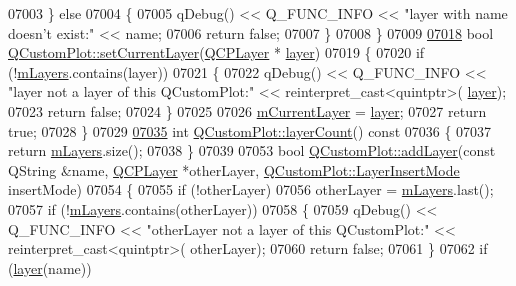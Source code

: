 \begin{DoxyCode}
07003   \} \textcolor{keywordflow}{else}
07004   \{
07005     qDebug() << Q\_FUNC\_INFO << \textcolor{stringliteral}{"layer with name doesn't exist:"} << name;
07006     \textcolor{keywordflow}{return} \textcolor{keyword}{false};
07007   \}
07008 \}
07009 
\hypertarget{a00115_source_l07018}{}\hyperlink{a00116_a23a4d3cadad1a0063c5fe19aac5659e6}{07018} \textcolor{keywordtype}{bool} \hyperlink{a00116_a73a6dc47c653bb6f8f030abca5a11852}{QCustomPlot::setCurrentLayer}(\hyperlink{a00043}{QCPLayer} *
      \hyperlink{a00116_ae576ada60c1133318e29348d43d3cf10}{layer})
07019 \{
07020   \textcolor{keywordflow}{if} (!\hyperlink{a00116_ae46b0ffefe1087007ffb11398a18a20e}{mLayers}.contains(layer))
07021   \{
07022     qDebug() << Q\_FUNC\_INFO << \textcolor{stringliteral}{"layer not a layer of this QCustomPlot:"} << \textcolor{keyword}{reinterpret\_cast<}quintptr\textcolor{keyword}{>}(
      \hyperlink{a00116_ae576ada60c1133318e29348d43d3cf10}{layer});
07023     \textcolor{keywordflow}{return} \textcolor{keyword}{false};
07024   \}
07025   
07026   \hyperlink{a00116_ae9821179b860bf04af25882e881e5e09}{mCurrentLayer} = \hyperlink{a00116_ae576ada60c1133318e29348d43d3cf10}{layer};
07027   \textcolor{keywordflow}{return} \textcolor{keyword}{true};
07028 \}
07029 
\hypertarget{a00115_source_l07035}{}\hyperlink{a00116_a1b3926884f5bd4bdda1495d8b3c891d0}{07035} \textcolor{keywordtype}{int} \hyperlink{a00116_a1b3926884f5bd4bdda1495d8b3c891d0}{QCustomPlot::layerCount}()\textcolor{keyword}{ const}
07036 \textcolor{keyword}{}\{
07037   \textcolor{keywordflow}{return} \hyperlink{a00116_ae46b0ffefe1087007ffb11398a18a20e}{mLayers}.size();
07038 \}
07039 
07053 \textcolor{keywordtype}{bool} \hyperlink{a00116_acfae623ec58e4f9e35014062580e4720}{QCustomPlot::addLayer}(\textcolor{keyword}{const} QString &name, \hyperlink{a00043}{QCPLayer} *otherLayer, 
      \hyperlink{a00116_acf68ae22e9b44e959fc82bc6366e9b8d}{QCustomPlot::LayerInsertMode} insertMode)
07054 \{
07055   \textcolor{keywordflow}{if} (!otherLayer)
07056     otherLayer = \hyperlink{a00116_ae46b0ffefe1087007ffb11398a18a20e}{mLayers}.last();
07057   \textcolor{keywordflow}{if} (!\hyperlink{a00116_ae46b0ffefe1087007ffb11398a18a20e}{mLayers}.contains(otherLayer))
07058   \{
07059     qDebug() << Q\_FUNC\_INFO << \textcolor{stringliteral}{"otherLayer not a layer of this QCustomPlot:"} << \textcolor{keyword}{reinterpret\_cast<}quintptr\textcolor{keyword}{>}(
      otherLayer);
07060     \textcolor{keywordflow}{return} \textcolor{keyword}{false};
07061   \}
07062   \textcolor{keywordflow}{if} (\hyperlink{a00116_ae576ada60c1133318e29348d43d3cf10}{layer}(name))

\end{DoxyCode}
